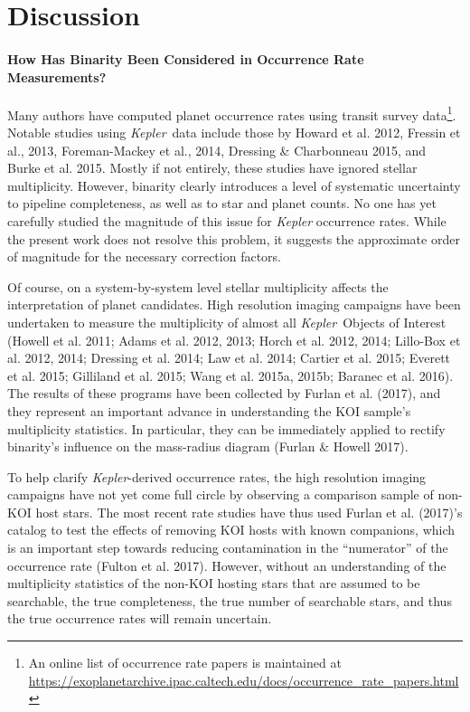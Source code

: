 \section{Discussion}
\label{sec:discussion}

\paragraph{How Has Binarity Been Considered in Occurrence Rate Measurements?}
Many authors have computed planet occurrence rates using transit 
survey data\footnote{
    An online list of occurrence rate papers is maintained at 
    \url{https://exoplanetarchive.ipac.caltech.edu/docs/occurrence_rate_papers.html}
}.
Notable studies using {\it Kepler}\ data include those by Howard et al. 2012, 
Fressin et al., 2013, Foreman-Mackey et al., 2014, Dressing \& Charbonneau 
2015, and Burke et al. 2015.
Mostly if not entirely, these studies have ignored stellar multiplicity.
However, binarity clearly introduces a level of systematic uncertainty to 
pipeline completeness, as well as to star and planet counts.
No one has yet carefully studied the magnitude of this issue for 
{\it Kepler} occurrence rates.
While the present work does not resolve this problem, it suggests the 
approximate order of magnitude for the necessary correction factors.

Of course, on a system-by-system level stellar multiplicity affects the 
interpretation of planet candidates. High resolution imaging 
campaigns have been undertaken to measure the multiplicity of 
almost all {\it Kepler}\ Objects of Interest 
(Howell et al. 2011; Adams et al. 2012, 2013; Horch et al. 2012, 2014; 
Lillo-Box et al. 2012, 2014; Dressing et al. 2014; Law et al. 2014; Cartier et 
al. 2015; Everett et al. 2015; Gilliland et al. 2015; Wang et al. 2015a, 
2015b; Baranec et al. 2016).
The results of these programs have been collected by Furlan et al. 
(2017), and they represent an important advance in understanding the KOI 
sample's multiplicity statistics.
In particular, they can be immediately applied to rectify binarity's influence 
on the mass-radius diagram (Furlan \& Howell 2017).


To help clarify {\it Kepler}-derived occurrence rates, the high resolution 
imaging campaigns have not yet come full circle by observing a comparison 
sample of non-KOI host stars.
The most recent rate studies have thus used Furlan et al. (2017)'s 
catalog to test the effects of removing KOI hosts with known companions, which 
is an important step towards reducing contamination in the ``numerator'' of 
the occurrence rate (Fulton et al. 2017).
However, without an understanding of the multiplicity statistics of the 
non-KOI hosting stars that are assumed to be searchable, the 
true completeness, the true number of searchable stars, and thus the true 
occurrence rates will remain uncertain.


